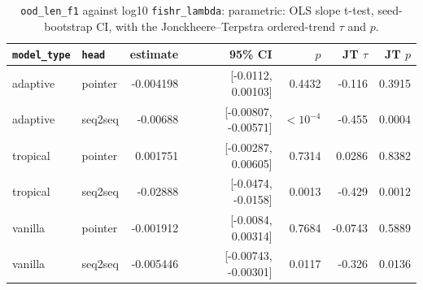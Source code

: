 \documentclass[10pt]{article}
\begin{document}
{\small
\begin{longtable}{llrrrrr}
\caption{\texttt{ood\_len\_f1} against log10 \texttt{fishr\_lambda}: parametric: OLS slope t-test, seed-bootstrap CI, with the Jonckheere--Terpstra ordered-trend $\tau$ and $p$.}\label{tab:trend-ood_len_f1}\\
\toprule
\texttt{model\_type} & \texttt{head} & estimate & 95\% CI & $p$ & JT $\tau$ & JT $p$\\
\midrule
\endhead
adaptive & pointer & -0.004198 & [-0.0112, 0.00103] & 0.4432 & -0.116 & 0.3915\\
adaptive & seq2seq & -0.00688 & [-0.00807, -0.00571] & $<10^{-4}$ & -0.455 & 0.0004\\
tropical & pointer & 0.001751 & [-0.00287, 0.00605] & 0.7314 & 0.0286 & 0.8382\\
tropical & seq2seq & -0.02888 & [-0.0474, -0.0158] & 0.0013 & -0.429 & 0.0012\\
vanilla & pointer & -0.001912 & [-0.0084, 0.00314] & 0.7684 & -0.0743 & 0.5889\\
vanilla & seq2seq & -0.005446 & [-0.00743, -0.00301] & 0.0117 & -0.326 & 0.0136\\
\bottomrule
\end{longtable}
}
\end{document}
